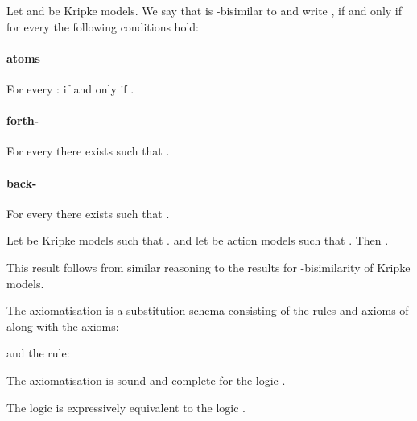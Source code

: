 \documentclass[twoside]{aiml14}
\begin{document}
  \begin{definition}
      Let  
      and 
      be Kripke models. 
      We say that  is -bisimilar
      to  
      and write ,
      if and only if
      for every  the following conditions hold:

      \paragraph{atoms}
      For every :  if and only if .

      \paragraph{forth-}
      For every  
      there exists 
      such that .

      \paragraph{back-}
      For every 
      there exists  
      such that  .
  \end{definition}

  \begin{proposition}
      Let  be Kripke models such that
      . 
      and let  be action models such that
      .
      Then
      .
  \end{proposition}

  This result follows from similar reasoning to the results for -bisimilarity of Kripke models.

  \begin{definition}\label{aml-k-axioms}
  The axiomatisation \axiomAmlK{} is a substitution schema consisting of the
  rules and axioms of \axiomK{} along with the axioms:
  
  and the rule:
  
  \end{definition}

  \begin{proposition}\label{aml-k-soundness-completeness}
      The axiomatisation \axiomAmlK{} is sound and complete for the logic \logicAmlK{}.
  \end{proposition}

  \begin{proposition}\label{aml-k-expressive-equivalence}
      The logic \logicAmlK{} is expressively equivalent to the logic \logicK{}.
  \end{proposition}
\end{document}
